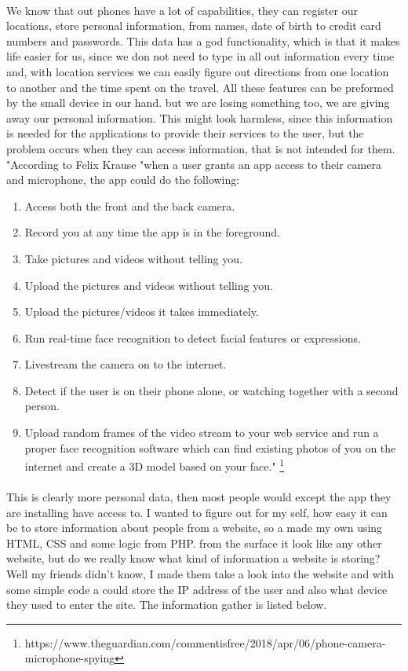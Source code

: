 \documentclass{article}
\begin{document}
\paragraph{}
We know that out phones have a lot of capabilities, they can register our locations, store personal information, from names, date of birth to credit card numbers and passwords. This data has a god functionality, which is that it makes life easier for us, since we don not need to type in all out information every time and, with location services we can easily figure out directions from one location to another and the time spent on the travel. All these features can be preformed by the small device in our hand. but we are losing something too, we are giving away our personal information. This might look harmless, since this information is needed for the applications to provide their services to the user, but the problem occurs when they can access information, that is not intended for them. "According to Felix Krause "when a user grants an app access to their camera and microphone, the app could do the following:

\begin{enumerate}
\item Access both the front and the back camera. 
\item Record you at any time the app is in the foreground.
\item Take pictures and videos without telling you.
\item Upload the pictures and videos without telling you.
\item Upload the pictures/videos it takes immediately.
\item Run real-time face recognition to detect facial features or expressions.
\item Livestream the camera on to the internet.
\item Detect if the user is on their phone alone, or watching together with a second person.
\item Upload random frames of the video stream to your web service and run a proper face recognition software which can find existing photos of you on the internet and create a 3D model based on your face." \footnote{https://www.theguardian.com/commentisfree/2018/apr/06/phone-camera-microphone-spying}
\end{enumerate}

\paragraph{}
This is clearly more personal data, then most people would except the app they are installing have access to. I wanted to figure out for my self, how easy it can be to store information about people from a website, so a made my own using HTML, CSS and some logic from PHP. from the surface it look like any other website, but do we really know what kind of information a website is storing? Well my friends didn't know, I made them take a look into the website and with some simple code a could store the IP address of the user and also what device they used to enter the site. The information gather is listed below.
\end{document}
